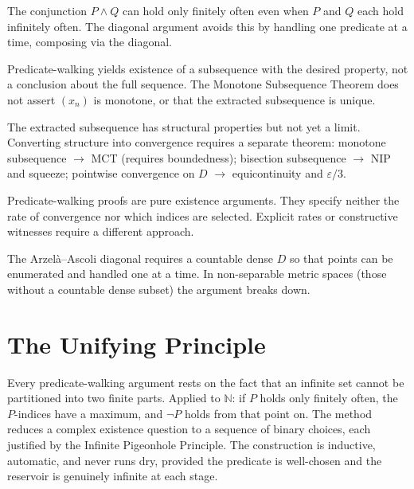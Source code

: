 \begin{remark}
The conjunction $P\wedge Q$ can hold only finitely often even when $P$ and
$Q$ each hold infinitely often. The diagonal argument avoids this by handling
one predicate at a time, composing via the diagonal.
\end{remark}

\begin{remark}
Predicate-walking yields existence of a subsequence with the desired
property, not a conclusion about the full sequence. The Monotone Subsequence
Theorem does not assert $(x_n)$ is monotone, or that the extracted
subsequence is unique.
\end{remark}

\begin{remark}
The extracted subsequence has structural properties but not yet a limit.
Converting structure into convergence requires a separate theorem:
monotone subsequence $\to$ MCT (requires boundedness);
bisection subsequence $\to$ NIP and squeeze;
pointwise convergence on $D$ $\to$ equicontinuity and $\varepsilon/3$.
\end{remark}

\begin{remark}
Predicate-walking proofs are pure existence arguments. They specify neither
the rate of convergence nor which indices are selected. Explicit rates or
constructive witnesses require a different approach.
\end{remark}

\begin{remark}
The Arzel\`a--Ascoli diagonal requires a countable dense $D$ so that points
can be enumerated and handled one at a time. In non-separable metric spaces
(those without a countable dense subset) the argument breaks down.
\end{remark}

\section*{The Unifying Principle}

\begin{remark}
Every predicate-walking argument rests on the fact that an infinite set
cannot be partitioned into two finite parts. Applied to $\mathbb{N}$: if
$P$ holds only finitely often, the $P$-indices have a maximum, and $\neg P$
holds from that point on. The method reduces a complex existence question
to a sequence of binary choices, each justified by the Infinite Pigeonhole
Principle. The construction is inductive, automatic, and never runs dry,
provided the predicate is well-chosen and the reservoir is genuinely infinite
at each stage.
\end{remark}

